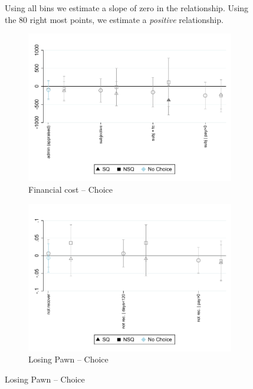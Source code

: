 \documentclass[oneside,11pt]{article}
\begin{document}
\begin{figure}[H]
 Using all bins we estimate a slope of zero in the relationship. Using the 80 right most points, we estimate a \textit{positive} relationship.
\end{figure}






\begin{figure}[H]
    \caption{The effect of promises}
    \label{fc_pro5}
    \begin{center}
    

        \begin{subfigure}{0.45\textwidth}
        \caption{Financial cost -- Choice}
        \centering
        \includegraphics[width=\textwidth]{Figuras/fc_te_pro_5.pdf}
    \end{subfigure}
    \begin{subfigure}{0.45\textwidth}
        \caption{Losing Pawn -- Choice}
        \centering
        \includegraphics[width=\textwidth]{Figuras/def_te_pro_5.pdf}
    \end{subfigure}
    

\end{center}
\end{figure}
\end{document}
